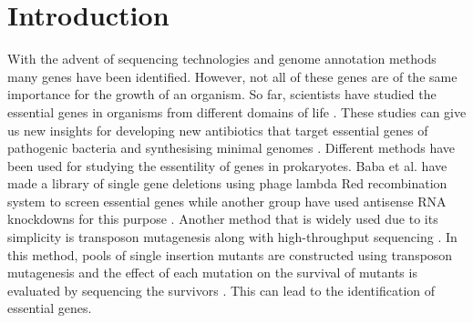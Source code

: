 \documentclass[12pt,letterpaper]{article}
\begin{document}
\section{Introduction}
With the advent of sequencing technologies and genome annotation methods many genes have been identified. However, not all of these genes are of the same importance for the growth of an organism. So far, scientists have studied the essential genes in organisms from different domains of life \cite{luo_deg_2014}. These studies can give us new insights for developing new antibiotics that target essential genes of pathogenic bacteria \cite{clatworthy_targeting_2007, peters_comprehensive_2016} and synthesising minimal genomes \cite{hutchison_global_1999, hutchison_design_2016, reus_blueprint_2016}. Different methods have been used for studying the essentility of genes in prokaryotes. Baba et al.\@ \cite{baba_construction_2006} have made a library of single gene deletions using phage lambda Red recombination system to screen essential genes while another group have used antisense RNA knockdowns for this purpose \cite{xu_staphylococcus_2010}. Another method that is widely used due to its simplicity is transposon mutagenesis along with high-throughput sequencing \cite{gawronski_tracking_2009, van_opijnen_tn-seq:_2009, langridge_simultaneous_2009, christen_essential_2011, goodman_identifying_2011, wetmore_rapid_2015, rubin_essential_2015}. In this method, pools of single insertion mutants are constructed using transposon mutagenesis and the effect of each mutation on the survival of mutants is evaluated by sequencing the survivors \cite{barquist_approaches_2013}. This can lead to the identification of essential genes.
\end{document}
